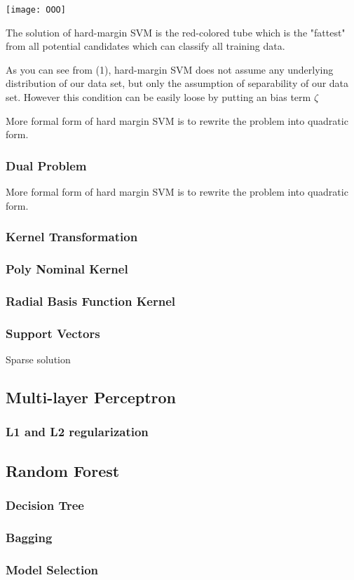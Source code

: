 \begin{center}
{
\texttt{[image: OOO]}
}
\end{center}
The solution of hard-margin SVM is the red-colored tube which is the "fattest" from all potential candidates which can classify all training data.

As you can see from (1), hard-margin SVM does not assume any underlying distribution of our data set, but only the assumption of separability of our data set. However this condition can be easily loose by putting an bias term $\zeta$ 

More formal form of hard margin SVM is to rewrite the problem into quadratic form.

\subsubsection{Dual Problem}

More formal form of hard margin SVM is to rewrite the problem into quadratic form.

\subsubsection*{Kernel Transformation}
\subsubsection*{Poly Nominal Kernel}
\subsubsection*{Radial Basis Function Kernel}
\subsubsection*{Support Vectors}
Sparse solution


\subsection{Multi-layer Perceptron}
\subsubsection*{L1 and L2 regularization}

\subsection{Random Forest}
\subsubsection{Decision Tree}
\subsubsection*{Bagging}
\subsubsection*{Model Selection}
